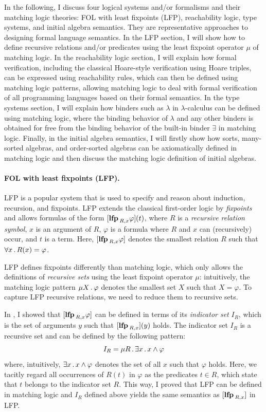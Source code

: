 \documentclass[11pt]{article}
\begin{document}
In the following, I discuss four logical systems and/or formalisms and their 
matching logic theories:
FOL with least fixpoints (LFP),
reachability logic, 
type systems, and initial algebra semantics. 
They are representative approaches to designing formal language semantics. 
In the LFP section, I will show how to define recursive relations and/or 
predicates
using the least fixpoint operator $\mu$ of matching logic. 
In the reachability logic section, I will explain how formal verification,
including the classical Hoare-style verification using Hoare triples,
can be expressed using reachability rules, which can then be defined using 
matching logic patterns, allowing matching logic to deal with formal 
verification of all programming languages based on their formal semantics. 
In the type systems section, I will explain how binders such as $\lambda$
in $\lambda$-calculus can be defined using matching logic, where the binding 
behavior of $\lambda$ and any other binders is obtained for free
from the binding behavior of the built-in binder $\exists$ in matching logic.
Finally, in the initial algebra semantics, I will firstly show how sorts, 
many-sorted algebras, and order-sorted algebras can be axiomatically defined in 
matching logic and then discuss the matching logic definition of initial 
algebras. 

\paragraph{FOL with least fixpoints (LFP).}
LFP is a popular system that is used to specify and reason about 
induction, recursion, and fixpoints. 
LFP extends the classical first-order logic by \emph{fixpoints} 
and allows formulas of the form
$
[{\mathbf{lfp}\,}_{R,x} \varphi](t)
$,
where $R$ is a \emph{recursive relation symbol}, $x$ is an argument of $R$, 
$\varphi$ is a formula where $R$ and $x$ can (recursively) occur, and $t$ is a 
term. 
Here, $[{\mathbf{lfp}\,}_{R,x} \varphi]$ denotes the smallest relation $R$ such that
$\forall x \,.\, R(x) = \varphi$. 

LFP defines fixpoints differently than matching logic, which only allows the 
definitions of \emph{recursive sets} using the least fixpoint operator $\mu$:
intuitively, the matching logic pattern $\mu X \,.\, \varphi$ denotes the 
smallest set $X$ such that $X = \varphi$. 
To capture LFP recursive relations, we need to reduce them to recursive sets. 

In \cite{CR19}, I showed that $[{\mathbf{lfp}\,}_{R,x} \varphi]$ can be defined in terms of 
its \emph{indicator set} $I_R$, which is the set of arguments $y$ 
such that $[{\mathbf{lfp}\,}_{R,x}](y)$ holds.
The indicator set $I_R$ is a recursive set and can be defined by the following 
pattern:
$$
I_R = \mu R \,.\, \exists x \,.\, x \land \varphi
$$
where, intuitively, $\exists x \,.\, x \land \varphi$ denotes the set of all $x$ 
such that $\varphi$ holds. 
Here, we tacitly regard all occurrences of $R(t)$ in $\varphi$ 
as the predicates $t \in R$, which state that $t$ belongs to the indicator set 
$R$.  
This way, I proved that LFP can be defined in matching logic 
and $I_R$ defined above yields the same semantics as $[{\mathbf{lfp}\,}_{R,x}]$ in LFP. 
\end{document}
